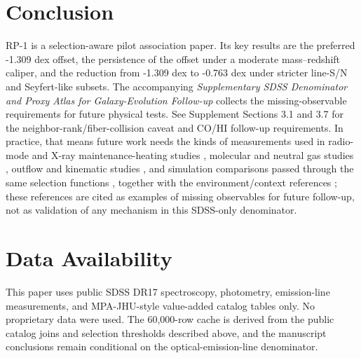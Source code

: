 \documentclass[twocolumn]{aastex631}
\begin{document}
\section{Conclusion}
RP-1 is a selection-aware pilot association paper. Its key results are the preferred -1.309 dex offset, the persistence of the offset under a moderate mass--redshift caliper, and the reduction from -1.309 dex to -0.763 dex under stricter line-S/N and Seyfert-like subsets. The accompanying \emph{Supplementary SDSS Denominator and Proxy Atlas for Galaxy-Evolution Follow-up} collects the missing-observable requirements for future physical tests. See Supplement Sections 3.1 and 3.7 for the neighbor-rank/fiber-collision caveat and CO/HI follow-up requirements.
In practice, that means future work needs the kinds of measurements used in radio-mode and X-ray maintenance-heating studies \citep{best2005,fabian2012,mcnamara2007,heckmanbest2014,lamassa2013}, molecular and neutral gas studies \citep{xcoldgass2017,xgass2018}, outflow and kinematic studies \citep{veilleux2005,cicone2014,carniani2017,fiore2017}, and simulation comparisons passed through the same selection functions \citep{simba2019,tng2019,eagle2015}, together with the environment/context references \citep{peng2010,ellison2011,piotrowska2022,wetzel2013,dekel2006}; these references are cited as examples of missing observables for future follow-up, not as validation of any mechanism in this SDSS-only denominator.

\section*{Data Availability}
This paper uses public SDSS DR17 spectroscopy, photometry, emission-line measurements, and MPA-JHU-style value-added catalog tables only. No proprietary data were used. The 60,000-row cache is derived from the public catalog joins and selection thresholds described above, and the manuscript conclusions remain conditional on the optical-emission-line denominator.

\end{document}
